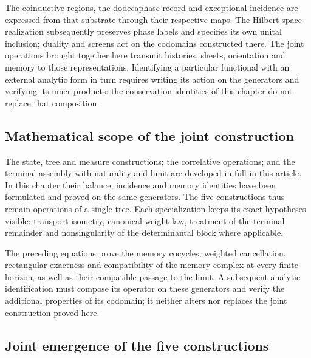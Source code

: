 The coinductive regions, the dodecaphase record and exceptional incidence are expressed from that substrate through their respective maps. The Hilbert-space realization subsequently preserves phase labels and specifies its own unital inclusion; duality and screens act on the codomains constructed there. The joint operations brought together here transmit histories, sheets, orientation and memory to those representations. Identifying a particular functional with an external analytic form in turn requires writing its action on the generators and verifying its inner products: the conservation identities of this chapter do not replace that composition.

\subsection{Mathematical scope of the joint construction}
The state, tree and measure constructions; the correlative operations; and the terminal assembly with naturality and limit are developed in full in this article. In this chapter their balance, incidence and memory identities have been formulated and proved on the same generators. The five constructions thus remain operations of a single tree. Each specialization keeps its exact hypotheses visible: transport isometry, canonical weight law, treatment of the terminal remainder and nonsingularity of the determinantal block where applicable.

The preceding equations prove the memory cocycles, weighted cancellation, rectangular exactness and compatibility of the memory complex at every finite horizon, as well as their compatible passage to the limit. A subsequent analytic identification must compose its operator on these generators and verify the additional properties of its codomain; it neither alters nor replaces the joint construction proved here.

\iffalse
\subsection{Joint emergence of the five constructions}
\label{hmtfg:base:sec:cinco-construcciones-continuo-ch}

